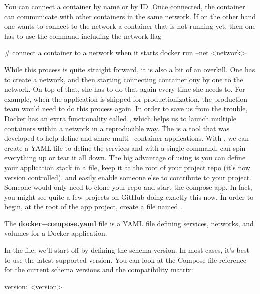 You can connect a container by name or by ID. Once connected, the container can communicate with other containers in
the same network. \v

If on the other hand one wants to connect to the network a container that is not running yet, then one has to use the
 command including the network  flag

\begin{bash}
# connect a container to a network when it starts
docker run --net <network>
\end{bash}

While this process is quite straight forward, it is also a bit of an overkill. One has to create a network, and then
starting connecting container ony by one to the network. On top of that, she has to do that again every time she
needs to. For example, when the application is shipped for productionization, the production team would need to do
this process again. In order to save us from the trouble, Docker has an extra functionality called , which helps us to launch multiple containers within a network in a reproducible way. \v

The  is a tool that was developed to help define and share multi$-$container applications. With
, we can create a YAML file to define the services and with a single command, can spin
everything up or tear it all down. The big advantage of using  is you can define your
application stack in a file, keep it at the root of your project repo (it’s now version controlled), and easily
enable someone else to contribute to your project. Someone would only need to clone your repo and start the compose
app. In fact, you might see quite a few projects on GitHub doing exactly this now. \v

In order to begin, at the root of the app project, create a file named .

The \textbf{docker$-$compose.yaml} file is a YAML file defining services, networks, and volumes for a Docker application.
\ed

In the  file, we’ll start off by defining the schema version. In most cases, it’s best to
use the latest supported version. You can look at the Compose file reference for the current schema versions and the
compatibility matrix:

\begin{block}
version: <version>
\end{block}

